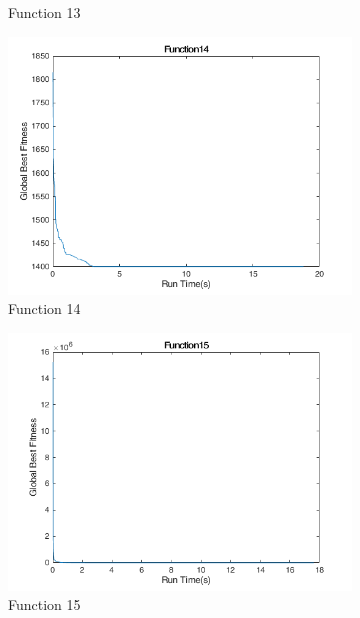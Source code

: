 \begin{figure}
\begin{subfigure}[b]{0.4\textwidth}
    \caption{Function 13}
  \end{subfigure}
  \begin{subfigure}[b]{0.4\textwidth}
    \includegraphics[width=\textwidth]{img/cecrt/f14}
    \caption{Function 14}
  \end{subfigure}
  \begin{subfigure}[b]{0.4\textwidth}
    \includegraphics[width=\textwidth]{img/cecrt/f15}
    \caption{Function 15}
  \end{subfigure}
  \begin{subfigure}[b]{0.4\textwidth}

\end{subfigure}
\end{figure}
